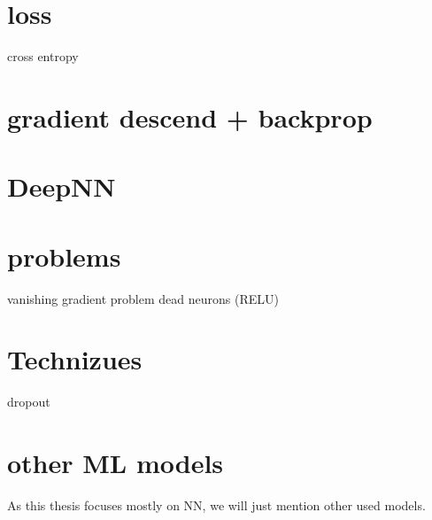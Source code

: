 \section{loss}
cross entropy
\section{gradient descend + backprop}
\section{DeepNN}
\section{problems}
vanishing gradient problem
dead neurons (RELU)
\section{Technizues}
dropout
\section{other ML models}

As this thesis focuses mostly on NN, we will just mention other used models.



